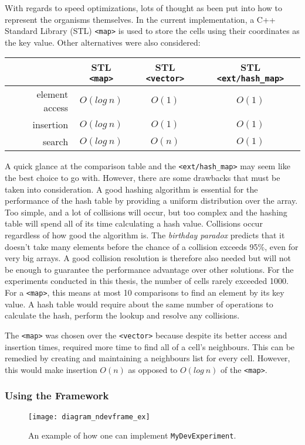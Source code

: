With regards to speed optimizations, lots of thought as been put into how to represent the organisms themselves. In the current implementation, a C++ Standard Library (STL) \texttt{<map>} is used to store the cells using their coordinates as the key value. Other alternatives were also considered:

\begin{center}
	\begin{tabular}{ r | c | c | c }
		~ & STL \texttt{<map>} & STL \texttt{<vector>} & STL \texttt{<ext/hash\_map>} \\
		\hline
		element access & $O(log~n)$ & $O(1)$ & $O(1)$ \\
		\hline
		insertion & $O(log~n)$ & $O(1)$ & $O(1)$ \\
		\hline
		search & $O(log~n)$ & $O(n)$ & $O(1)$ \\
	\end{tabular}
	\label{tbl:speed}
\end{center}

A quick glance at the comparison table and the \texttt{<ext/hash\_map>} may seem like the best choice to go with. However, there are some drawbacks that must be taken into consideration. A good hashing algorithm is essential for the performance of the hash table by providing a uniform distribution over the array. Too simple, and a lot of collisions will occur, but too complex and the hashing table will spend all of its time calculating a hash value. Collisions occur regardless of how good the algorithm is. The \emph{birthday paradox} predicts that it doesn't take many elements before the chance of a collision exceeds 95\%, even for very big arrays. A good collision resolution is therefore also needed but will not be enough to guarantee the performance advantage over other solutions. For the experiments conducted in this thesis, the number of cells rarely exceeded 1000. For a \texttt{<map>}, this means at most 10 comparisons to find an element by its key value. A hash table would require about the same number of operations to calculate the hash, perform the lookup and resolve any collisions.

The \texttt{<map>} was chosen over the \texttt{<vector>} because despite its better access and insertion times, required more time to find all of a cell's neighbours. This can be remedied by creating and maintaining a neighbours list for every cell. However, this would make insertion $O(n)$ as opposed to $O(log~n)$ of the \texttt{<map>}.

\subsubsection{Using the Framework}
\begin{figure}[!ht]
	\centering
	\texttt{[image: diagram\_ndevframe\_ex]}
	\caption{An example of how one can implement \texttt{MyDevExperiment}.}
	\label{fig:diagram_ndevframe_ex}
\end{figure}

